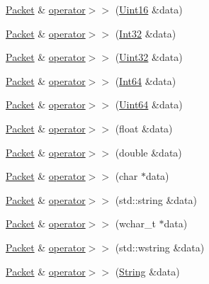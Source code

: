 \begin{DoxyCompactItemize}
\item 
\hyperlink{classsf_1_1_packet}{Packet} \& \hyperlink{classsf_1_1_packet_afd8706f092bc830ebb438aeee9271647}{operator$>$$>$} (\hyperlink{namespacesf_a2fcaf787248b0b83dfb6b145ca348246}{Uint16} \&data)
\item 
\hyperlink{classsf_1_1_packet}{Packet} \& \hyperlink{classsf_1_1_packet_ae7b44e79f12d500b63f5dc2a10d78d8c}{operator$>$$>$} (\hyperlink{namespacesf_ac2dfd4952377a26dee4750e2e4a30a15}{Int32} \&data)
\item 
\hyperlink{classsf_1_1_packet}{Packet} \& \hyperlink{classsf_1_1_packet_a4b57e1953db5bec39a851929df9a339a}{operator$>$$>$} (\hyperlink{namespacesf_aa746fb1ddef4410bddf198ebb27e727c}{Uint32} \&data)
\item 
\hyperlink{classsf_1_1_packet}{Packet} \& \hyperlink{classsf_1_1_packet_a8409de6477e17ca48225a835451261c1}{operator$>$$>$} (\hyperlink{namespacesf_a2840579fed3494d9f330baf7a5a19903}{Int64} \&data)
\item 
\hyperlink{classsf_1_1_packet}{Packet} \& \hyperlink{classsf_1_1_packet_a8fa9c970062753b03e43db4999fc7743}{operator$>$$>$} (\hyperlink{namespacesf_add9ac83466d96b9f50a009b9f4064266}{Uint64} \&data)
\item 
\hyperlink{classsf_1_1_packet}{Packet} \& \hyperlink{classsf_1_1_packet_a6704b4d13d6f798efe6fa836a8b5fa24}{operator$>$$>$} (float \&data)
\item 
\hyperlink{classsf_1_1_packet}{Packet} \& \hyperlink{classsf_1_1_packet_ac84239a8ba0a165394805c17b35a88cf}{operator$>$$>$} (double \&data)
\item 
\hyperlink{classsf_1_1_packet}{Packet} \& \hyperlink{classsf_1_1_packet_ae9f8d8b0c776204f79f615b1e58bccec}{operator$>$$>$} (char $\ast$data)
\item 
\hyperlink{classsf_1_1_packet}{Packet} \& \hyperlink{classsf_1_1_packet_aabace32063c44e1a5cc54af6267c1fab}{operator$>$$>$} (std\-::string \&data)
\item 
\hyperlink{classsf_1_1_packet}{Packet} \& \hyperlink{classsf_1_1_packet_a1444500d29df0991e630ac78933c6282}{operator$>$$>$} (wchar\-\_\-t $\ast$data)
\item 
\hyperlink{classsf_1_1_packet}{Packet} \& \hyperlink{classsf_1_1_packet_ab74c37a290385fd7b1f962bf954a2005}{operator$>$$>$} (std\-::wstring \&data)
\item 
\hyperlink{classsf_1_1_packet}{Packet} \& \hyperlink{classsf_1_1_packet_a081233e0cab2182a219b129a1383dc0b}{operator$>$$>$} (\hyperlink{classsf_1_1_string}{String} \&data)
\item 

\end{DoxyCompactItemize}
